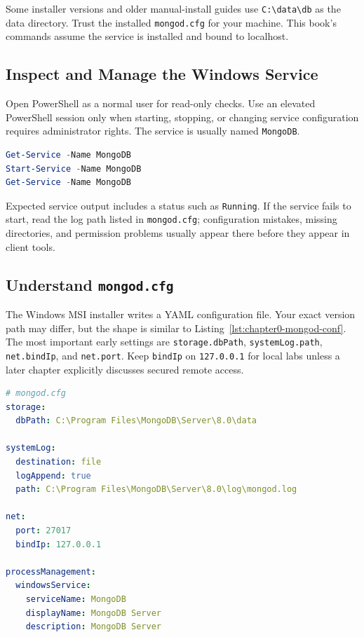 Some installer versions and older manual-install guides use \texttt{C:\textbackslash data\textbackslash db} as the data directory. Trust the installed \texttt{mongod.cfg} for your machine. This book's commands assume the service is installed and bound to localhost.

\subsection{Inspect and Manage the Windows Service}
Open PowerShell as a normal user for read-only checks. Use an elevated PowerShell session only when starting, stopping, or changing service configuration requires administrator rights. The service is usually named \texttt{MongoDB}.

\begin{lstlisting}[language=PowerShell, caption={Checking the local MongoDB Windows service with PowerShell.}]
Get-Service -Name MongoDB
Start-Service -Name MongoDB
Get-Service -Name MongoDB
\end{lstlisting}

Expected service output includes a status such as \texttt{Running}. If the service fails to start, read the log path listed in \texttt{mongod.cfg}; configuration mistakes, missing directories, and permission problems usually appear there before they appear in client tools.

\subsection{Understand \texttt{mongod.cfg}}
The Windows MSI installer writes a YAML configuration file. Your exact version path may differ, but the shape is similar to Listing~\ref{lst:chapter0-mongod-conf}. The most important early settings are \texttt{storage.dbPath}, \texttt{systemLog.path}, \texttt{net.bindIp}, and \texttt{net.port}. Keep \texttt{bindIp} on \texttt{127.0.0.1} for local labs unless a later chapter explicitly discusses secured remote access.

\begin{lstlisting}[language=yaml, caption={Representative Windows \texttt{mongod.cfg} for local labs.}, label={lst:chapter0-mongod-conf}]
# mongod.cfg
storage:
  dbPath: C:\Program Files\MongoDB\Server\8.0\data

systemLog:
  destination: file
  logAppend: true
  path: C:\Program Files\MongoDB\Server\8.0\log\mongod.log

net:
  port: 27017
  bindIp: 127.0.0.1

processManagement:
  windowsService:
    serviceName: MongoDB
    displayName: MongoDB Server
    description: MongoDB Server
\end{lstlisting}

